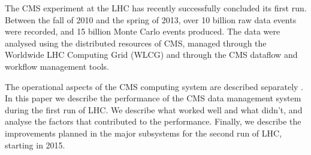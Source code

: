 The CMS \cite{CMS} experiment at the LHC has recently successfully concluded its first run. 
Between the fall of 2010 and the spring of 2013, over 10 billion raw data events were recorded, 
and 15 billion Monte Carlo events produced. The data were analysed using the distributed resources 
of CMS, managed through the Worldwide LHC Computing Grid (WLCG) \cite{WLCG} and through the CMS 
dataflow and workflow management tools.

The operational aspects of the CMS computing system are described separately \cite{OliOps}. In 
this paper we describe the performance of the CMS data management system during the first run of LHC. We describe 
what worked well and what didn't, and analyse the factors that contributed to the performance. 
Finally, we describe the improvements planned in the major subsystems for the second run of LHC, 
starting in 2015.
